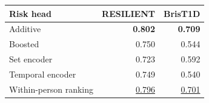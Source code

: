 \begin{tabular*}{\linewidth}{@{\extracolsep{\fill}}lrr@{}}
\toprule
Risk head & RESILIENT & BrisT1D \\
\midrule
\cellcolor{hnegray}Additive & \textbf{0.802} & \textbf{0.709} \\
Boosted & 0.750 & 0.544 \\
Set encoder & 0.723 & 0.592 \\
Temporal encoder & 0.749 & 0.540 \\
Within-person ranking & \underline{0.796} & \underline{0.701} \\
\bottomrule
\end{tabular*}